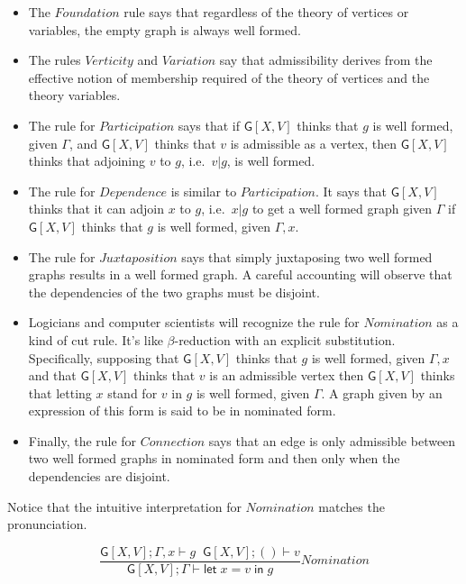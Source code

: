 \documentclass[12pt]{llncs}
\begin{document}
\begin{itemize}
\item
  The \(Foundation\) rule says that regardless of the theory of vertices
  or variables, the empty graph is always well formed.
\item
  The rules \(Verticity\) and \(Variation\) say that admissibility
  derives from the effective notion of membership required of the theory
  of vertices and the theory variables.
\item
  The rule for \(Participation\) says that if \(\mathsf{G}[X,V]\) thinks
  that \(g\) is well formed, given \(\Gamma\), and \(\mathsf{G}[X,V]\)
  thinks that \(v\) is admissible as a vertex, then \(\mathsf{G}[X,V]\)
  thinks that adjoining \(v\) to \(g\), i.e.~\(v|g\), is well formed.
\item
  The rule for \(Dependence\) is similar to \(Participation\). It says
  that \(\mathsf{G}[X,V]\) thinks that it can adjoin \(x\) to \(g\),
  i.e.~\(x|g\) to get a well formed graph given \(\Gamma\) if
  \(\mathsf{G}[X,V]\) thinks that \(g\) is well formed, given
  \(\Gamma,x\).
\item
  The rule for \(Juxtaposition\) says that simply juxtaposing two well
  formed graphs results in a well formed graph. A careful accounting
  will observe that the dependencies of the two graphs must be disjoint.
\item
  Logicians and computer scientists will recognize the rule for
  \(Nomination\) as a kind of cut rule. It's like \(\beta\)-reduction
  with an explicit substitution. Specifically, supposing that
  \(\mathsf{G}[X,V]\) thinks that \(g\) is well formed, given
  \(\Gamma,x\) and that \(\mathsf{G}[X,V]\) thinks that \(v\) is an
  admissible vertex then \(\mathsf{G}[X,V]\) thinks that letting \(x\)
  stand for \(v\) in \(g\) is well formed, given \(\Gamma\). A graph
  given by an expression of this form is said to be in nominated form.
\item
  Finally, the rule for \(Connection\) says that an edge is only
  admissible between two well formed graphs in nominated form and then
  only when the dependencies are disjoint.
\end{itemize}

Notice that the intuitive interpretation for \(Nomination\) matches the
pronunciation.

\[\frac{ \mathsf{G}[X,V];\Gamma,x \vdash g \; \;\mathsf{G}[X,V]; () \vdash v}{ \mathsf{G}[X,V]; \Gamma \vdash \mathsf{let}\; x = v \; \mathsf{in}\; g}Nomination\]
\end{document}
